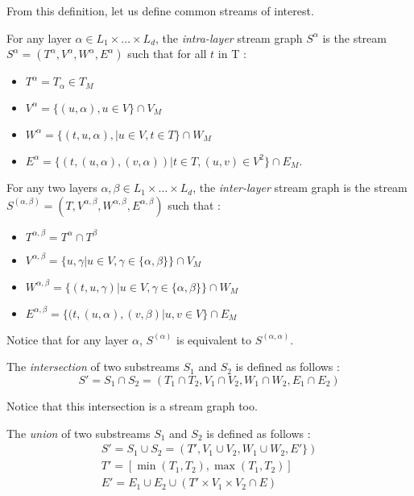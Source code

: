 \documentclass[dvipsnames,a4paper,11pt]{article}
\theoremstyle{definition}
\theoremstyle{remark}
\begin{document}
    From this definition, let us define common streams of interest.
   
	For any layer $\alpha \in L_1 \times \dots \times L_d$, the {\em intra-layer} stream graph $S^{\alpha}$ is the stream $S^{\alpha}=(T^{\alpha},V^{\alpha},W^{\alpha},E^{\alpha})$ such that for all $t$ in T :
	\begin{itemize}
		\item $T^{\alpha} = T_{\alpha} \in T_M$
		\item $V^{\alpha} =\{(u,\alpha),u\in V\} \cap V_M$
		\item $W^{\alpha} =\{(t,u,\alpha),|u\in V, t \in T \} \cap W_M$ 
		\item $E^{\alpha} = \{(t,(u,\alpha),(v,\alpha))| t \in T,(u,v)\in V^2 \} \cap E_M$.		
	\end{itemize}


	For any two layers $\alpha, \beta \in L_1\times \dots\times L_d$, the {\em inter-layer} stream graph is the stream $S^{(\alpha,\beta)} = (T, V^{\alpha,\beta},W^{\alpha,\beta},E^{\alpha,\beta})$ such that :
	\begin{itemize}
		\item $T^{\alpha,\beta}=T^{\alpha}\cap T^{\beta}$
		\item $V^{\alpha,\beta} = \{u,\gamma | u \in V, \gamma \in \{\alpha,\beta\} \} \cap V_M$
		\item $W^{\alpha,\beta}= \{(t,u,\gamma) | u \in V, \gamma \in \{\alpha,\beta\} \} \cap W_M$
	    \item $E^{\alpha,\beta} = \{(t,(u,\alpha),(v,\beta) | u,v \in V\} \cap E_M $
	\end{itemize}
	
	    Notice that for any layer $\alpha$, $S^{(\alpha)}$ is equivalent to $S^{(\alpha,\alpha)}$.
	

	
	The {\em intersection} of two substreams $S_1$ and $S_2$ is defined as follows :
	\[
		S' = S_1 \cap S_2 = (T_1\cap T_2, V_1 \cap V_2, W_1 \cap W_2, E_1\cap E_2) 
	\]
	
	Notice that this intersection is a stream graph too.
	
	The {\em union} of two substreams $S_1$ and $S_2$ is defined as follows :
	\begin{align*}
		S' = S_1 \cup S_2 = (T', V_1 \cup V_2, W_1 \cup W_2, E' \})\\
		T' = [\min(T_1,T_2),\max(T_1,T_2)]\\
		E' = E_1 \cup E_2 \cup (T'\times V_1 \times V_2 \cap E )
	\end{align*}
		 
\end{document}

